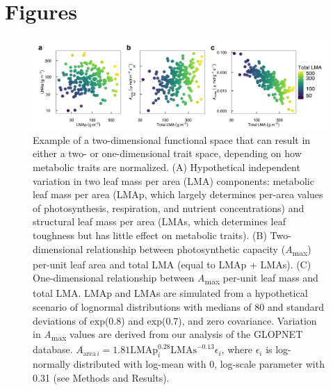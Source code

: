 \documentclass[
  12pt,
]{article}
\begin{document}
\newpage

\hypertarget{figures}{%
\section{Figures}\label{figures}}

\begin{figure}
\hypertarget{fig:Hplt}{%
\centering
\includegraphics{../figs/fig_hypo.png}
\caption{Example of a two-dimensional functional space that can result in either a two- or one-dimensional trait space, depending on how metabolic traits are normalized. (A) Hypothetical independent variation in two leaf mass per area (LMA) components: metabolic leaf mass per area (LMAp, which largely determines per-area values of photosynthesis, respiration, and nutrient concentrations) and structural leaf mass per area (LMAs, which determines leaf toughness but has little effect on metabolic traits).
(B) Two-dimensional relationship between photosynthetic capacity (\emph{A}\textsubscript{max}) per-unit leaf area and total LMA (equal to LMAp + LMAs).
(C) One-dimensional relationship between \emph{A}\textsubscript{max} per-unit leaf mass and total LMA.
LMAp and LMAs are simulated from a hypothetical scenario of lognormal distributions with medians of 80 and standard deviations of exp(0.8) and exp(0.7), and zero covariance.
Variation in \emph{A}\textsubscript{max} values are derived from our analysis of the GLOPNET database. \(A_{\mathrm{area} \, i}=1.81\mathrm{LMAp}_i^{0.28}\mathrm{LMAs}^{-0.13}\epsilon_i\), where \(\epsilon_i\) is log-normally distributed with log-mean with 0, log-scale parameter with 0.31 (see Methods and Results).}\label{fig:Hplt}
}
\end{figure}
\end{document}
